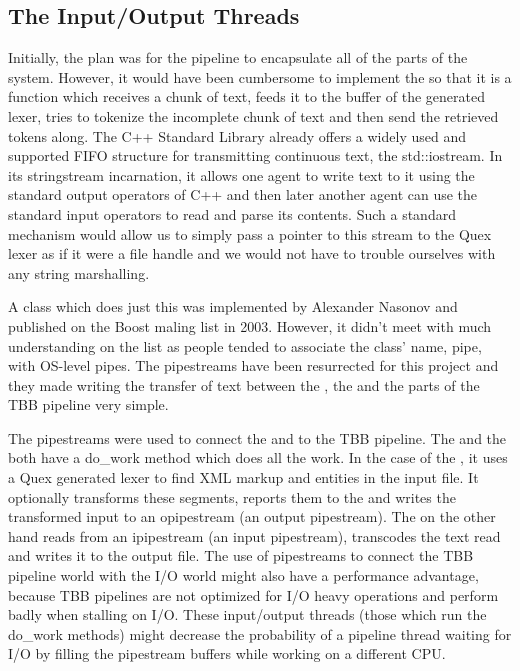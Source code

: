 \subsection{The Input/Output Threads}
\label{ssec:impl-parallel-io}

Initially, the plan was for the pipeline to encapsulate all of the parts of the
system. However, it would have been cumbersome to implement the
 so that it is a function which receives a chunk of text,
feeds it to the buffer of the generated lexer, tries to tokenize the incomplete
chunk of text and then send the retrieved tokens along. The C++ Standard
Library already offers a widely used and supported FIFO structure for
transmitting continuous text, the std::iostream. In its stringstream
incarnation, it allows one agent to write text to it using the standard output
operators of C++ and then later another agent can use the standard input
operators to read and parse its contents. Such a standard mechanism would allow
us to simply pass a pointer to this stream to the Quex lexer as if it were a
file handle and we would not have to trouble ourselves with any string
marshalling.

A class which does just this was implemented by Alexander Nasonov and published
on the Boost maling list in 2003. However, it didn't meet with much
understanding on the list as people tended to associate the class' name, pipe,
with OS-level pipes. The pipestreams have been resurrected for this project and
they made writing the transfer of text between the , the
 and the parts of the TBB pipeline very simple.

The pipestreams were used to connect the  and
 to the TBB pipeline. The  and the
 both have a do\_\-work method which does all the work. In the
case of the , it uses a Quex generated lexer to find XML
markup and entities in the input file. It optionally transforms these segments,
reports them to the  and writes the transformed input to
an opipestream (an output pipestream). The  on the other hand
reads from an ipipestream (an input pipestream), transcodes the text read and
writes it to the output file. The use of pipestreams to connect the TBB
pipeline world with the I/O world might also have a performance advantage,
because TBB pipelines are not optimized for I/O heavy operations and perform
badly when stalling on I/O. These input/output threads (those which run the
do\_\-work methods) might decrease the probability of a pipeline thread waiting
for I/O by filling the pipestream buffers while working on a different CPU.

